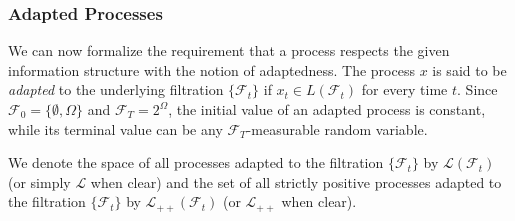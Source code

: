 \documentclass[\topdir/lecture\_notes.tex]{subfiles}
\begin{document}



\subsubsection{Adapted Processes}
We can now formalize the requirement that a process respects the given information structure with the notion of adaptedness. The process \(x\) is said to be \emph{adapted} to the underlying filtration \(\{\mathcal{F}_{t}\}\) if \(x_{t} \in L(\mathcal{F}_{t})\) for every time \(t\). Since \(\mathcal{F}_{0}=\{\emptyset, \Omega\}\) and \(\mathcal{F}_{T}=2^{\Omega}\), the initial value of an adapted process is constant, while its terminal value can be any \(\mathcal{F}_{T}\)-measurable random variable.

We denote the space of all processes adapted to the filtration \(\{\mathcal{F}_{t}\}\) by \(\mathcal{L}(\mathcal{F}_{t})\) (or simply \(\mathcal{L}\) when clear) and the set of all strictly positive processes adapted to the filtration \(\{\mathcal{F}_{t}\}\) by  \(\mathcal{L}_{++}(\mathcal{F}_{t})\) (or \(\mathcal{L}_{++}\) when clear).
\end{document}
